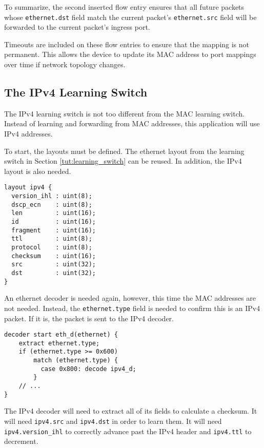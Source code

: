 To summarize, the second inserted flow entry ensures that all future packets whose
\texttt{ethernet.dst} field match the current packet's \texttt{ethernet.src}
field will be forwarded to the current packet's ingress port.

Timeouts are included on these flow entries to ensure that the
mapping is not permanent. This allows the device to update its
MAC address to port mappings over time if network topology changes.

\subsection{The IPv4 Learning Switch} \label{tut:learning_router}

The IPv4 learning switch is not too different from the MAC learning switch. 
Instead of learning and forwarding from MAC addresses, this application will use 
IPv4 addresses.

To start, the layouts must be defined. The ethernet layout
from the learning switch in Section \ref{tut:learning_switch} can be reused. 
In addition, the IPv4 layout is also needed.

\begin{codepage}
\begin{lstlisting}
layout ipv4 {
  version_ihl : uint(8);
  dscp_ecn    : uint(8);
  len         : uint(16);
  id          : uint(16);
  fragment    : uint(16);
  ttl         : uint(8);
  protocol    : uint(8);
  checksum    : uint(16);
  src         : uint(32);
  dst         : uint(32);
}
\end{lstlisting}
\end{codepage}

An ethernet decoder is needed again, however, this time the MAC
addresses are not needed. Instead, the \texttt{ethernet.type} field is needed to confirm
this is an IPv4 packet. If it is, the packet is sent to the IPv4 decoder.

\begin{codepage}
\begin{lstlisting}
decoder start eth_d(ethernet) {
	extract ethernet.type;
	if (ethernet.type >= 0x600)
	    match (ethernet.type) {
	      case 0x800: decode ipv4_d;
	    }
	// ...
}
\end{lstlisting}
\end{codepage}

The IPv4 decoder will need to extract all of its fields to calculate a checksum. It will need \texttt{ipv4.src} and \texttt{ipv4.dst} in
order to learn them. It will need \texttt{ipv4.version\_ihl} to
correctly advance past the IPv4 header and \texttt{ipv4.ttl} to decrement.

